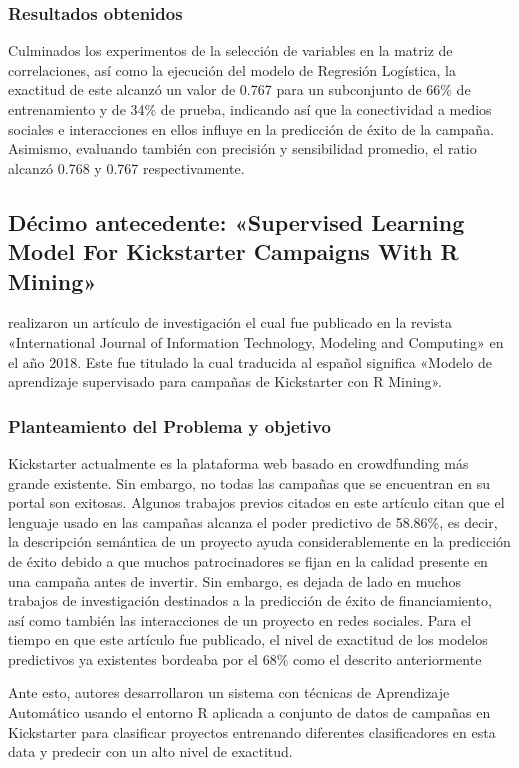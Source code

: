 \subsubsection{Resultados obtenidos}
Culminados los experimentos de la selección de variables en la matriz de correlaciones, así como la ejecución del modelo de Regresión Logística, la exactitud de este alcanzó un valor de 0.767 para un subconjunto de 66\% de entrenamiento y de 34\% de prueba, indicando así que la conectividad a medios sociales e interacciones en ellos influye en la predicción de éxito de la campaña. Asimismo, evaluando también con precisión y sensibilidad promedio, el ratio alcanzó 0.768 y 0.767 respectivamente.

\subsection{Décimo antecedente: «Supervised Learning Model For Kickstarter Campaigns With R Mining» \citep*{pr_kamath2018suplearn}}
\citeauthor{pr_kamath2018suplearn} realizaron un artículo de investigación el cual fue publicado en la revista «International Journal of Information Technology, Modeling and Computing» en el año 2018. Este fue titulado  la cual traducida al español significa «Modelo de aprendizaje supervisado para campañas de Kickstarter con R Mining».

\subsubsection{Planteamiento del Problema y objetivo}
Kickstarter actualmente es la plataforma web basado en crowdfunding más grande existente. Sin embargo, no todas las campañas que se encuentran en su portal son exitosas. Algunos trabajos previos citados en este artículo citan que el lenguaje usado en las campañas alcanza el poder predictivo de 58.86\%, es decir, la descripción semántica de un proyecto ayuda considerablemente en la predicción de éxito debido a que muchos patrocinadores se fijan en la calidad presente en una campaña antes de invertir.  Sin embargo, es dejada de lado en muchos trabajos de investigación destinados a la predicción de éxito de financiamiento, así como también las interacciones de un proyecto en redes sociales. Para el tiempo en que este artículo fue publicado, el nivel de exactitud de los modelos predictivos ya existentes bordeaba por el 68\% como el descrito anteriormente

Ante esto, autores desarrollaron un sistema con técnicas de Aprendizaje Automático usando el entorno R aplicada a conjunto de datos de campañas en Kickstarter para clasificar proyectos entrenando diferentes clasificadores en esta data y predecir con un alto nivel de exactitud.

